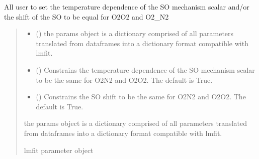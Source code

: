 \documentclass[letterpaper,10pt,english]{sphinxmanual}
\begin{document}
\begin{fulllineitems}
\begin{fulllineitems}
\label{\detokenize{MATS:MATS.fit_dataset.Fit_DataSet.constrained_CIA}}
\pysigstartsignatures
{}
\pysigstopsignatures
\sphinxAtStartPar
All user to set the temperature dependence of the SO mechanism scalar and/or the shift of the SO to be equal for O2\sphinxhyphen{}O2 and O2\_N2
\begin{quote}\begin{description}
\begin{itemize}
\item {} 
\sphinxAtStartPar
{} () \textendash{} the params object is a dictionary comprised of all parameters translated from dataframes into a dictionary format compatible with lmfit.

\item {} 
\sphinxAtStartPar
{} (\sphinxstyleliteralemphasis{\sphinxupquote{, }}) \textendash{} Constrains the temperature dependence of the SO mechanism scalar to be the same for O2\sphinxhyphen{}N2 and O2\sphinxhyphen{}O2. The default is True.

\item {} 
\sphinxAtStartPar
{} (\sphinxstyleliteralemphasis{\sphinxupquote{, }}) \textendash{} Constrains the SO shift to be the same for O2\sphinxhyphen{}N2 and O2\sphinxhyphen{}O2. The default is True.

\end{itemize}

\sphinxAtStartPar
{} \textendash{} the params object is a dictionary comprised of all parameters translated from dataframes into a dictionary format compatible with lmfit.

\sphinxAtStartPar
lmfit parameter object


\end{description}
\end{quote}
\end{fulllineitems}
\end{fulllineitems}
\end{document}
